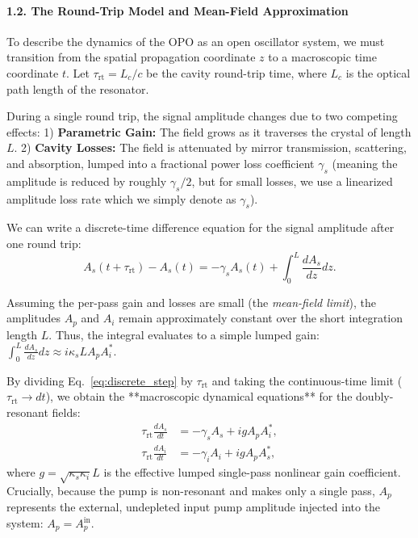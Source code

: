 \begin{resolucao}[Solution]
    \paragraph*{1.2. The Round-Trip Model and Mean-Field Approximation}
    To describe the dynamics of the OPO as an open oscillator system, we must transition from the spatial propagation coordinate $z$ to a macroscopic time coordinate $t$. Let $\tau_{\mathrm{rt}} = L_c/c$ be the cavity round-trip time, where $L_c$ is the optical path length of the resonator.

    During a single round trip, the signal amplitude changes due to two competing effects: 
    1) \textbf{Parametric Gain:} The field grows as it traverses the crystal of length $L$.
    2) \textbf{Cavity Losses:} The field is attenuated by mirror transmission, scattering, and absorption, lumped into a fractional power loss coefficient $\gamma_s$ (meaning the amplitude is reduced by roughly $\gamma_s/2$, but for small losses, we use a linearized amplitude loss rate which we simply denote as $\gamma_s$).

    We can write a discrete-time difference equation for the signal amplitude after one round trip:
    \begin{equation}
        A_s(t + \tau_{\mathrm{rt}}) - A_s(t) = -\gamma_s A_s(t) + \int_{0}^{L} \frac{dA_s}{dz} dz.
        \label{eq:discrete_step}
    \end{equation}
    
    Assuming the per-pass gain and losses are small (the \textit{mean-field limit}), the amplitudes $A_p$ and $A_i$ remain approximately constant over the short integration length $L$. Thus, the integral evaluates to a simple lumped gain: $\int_{0}^{L} \frac{dA_s}{dz} dz \approx i \kappa_s L A_p A_i^*$. 
    
    By dividing Eq.~\eqref{eq:discrete_step} by $\tau_{\mathrm{rt}}$ and taking the continuous-time limit ($\tau_{\mathrm{rt}} \to dt$), we obtain the **macroscopic dynamical equations** for the doubly-resonant fields:
    \begin{align}
        \tau_{\mathrm{rt}} \frac{dA_s}{dt} &= -\gamma_s A_s + i g A_p A_i^*, \label{eq:dro_dyn_s} \\
        \tau_{\mathrm{rt}} \frac{dA_i}{dt} &= -\gamma_i A_i + i g A_p A_s^*, \label{eq:dro_dyn_i}
    \end{align}
    where $g = \sqrt{\kappa_s \kappa_i} L$ is the effective lumped single-pass nonlinear gain coefficient. Crucially, because the pump is non-resonant and makes only a single pass, $A_p$ represents the external, undepleted input pump amplitude injected into the system: $A_p = A_p^{\mathrm{in}}$.


\end{resolucao}
